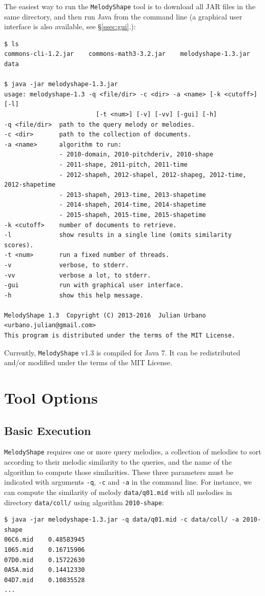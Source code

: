 \documentclass[twoside]{article}
\begin{document}
The easiest way to run the \texttt{MelodyShape} tool is to download all JAR files in the same directory, and then run Java from the command line (a graphical user interface is also available, see \S\ref{ssec:gui}.):
\begin{lstlisting}
$ ls
commons-cli-1.2.jar    commons-math3-3.2.jar    melodyshape-1.3.jar    data

$ java -jar melodyshape-1.3.jar
usage: melodyshape-1.3 -q <file/dir> -c <dir> -a <name> [-k <cutoff>] [-l]
                         [-t <num>] [-v] [-vv] [-gui] [-h]
-q <file/dir>  path to the query melody or melodies.
-c <dir>       path to the collection of documents.
-a <name>      algorithm to run:
               - 2010-domain, 2010-pitchderiv, 2010-shape
               - 2011-shape, 2011-pitch, 2011-time
               - 2012-shapeh, 2012-shapel, 2012-shapeg, 2012-time, 2012-shapetime
               - 2013-shapeh, 2013-time, 2013-shapetime
               - 2014-shapeh, 2014-time, 2014-shapetime
               - 2015-shapeh, 2015-time, 2015-shapetime
-k <cutoff>    number of documents to retrieve.
-l             show results in a single line (omits similarity scores).
-t <num>       run a fixed number of threads.
-v             verbose, to stderr.
-vv            verbose a lot, to stderr.
-gui           run with graphical user interface.
-h             show this help message.

MelodyShape 1.3  Copyright (C) 2013-2016  Julian Urbano <urbano.julian@gmail.com>
This program is distributed under the terms of the MIT License.
\end{lstlisting}

Currently, \texttt{MelodyShape} v1.3 is compiled for Java 7. It can be redistributed and/or modified under the terms of the MIT License.

\section{Tool Options}

\subsection{Basic Execution}

\texttt{MelodyShape} requires one or more query melodies, a collection of melodies to sort according to their melodic similarity to the queries, and the name of the algorithm to compute those similarities. These three parameters must be indicated with arguments \texttt{-q}, \texttt{-c} and \texttt{-a} in the command line. For instance, we can compute the similarity of melody \texttt{data/q01.mid} with all melodies in directory \texttt{data/coll/} using algorithm \texttt{2010-shape}:
\begin{lstlisting}
$ java -jar melodyshape-1.3.jar -q data/q01.mid -c data/coll/ -a 2010-shape
06C6.mid    0.48583945
1065.mid    0.16715906
07D0.mid    0.15722630
0A5A.mid    0.14412330
04D7.mid    0.10835528
...
\end{lstlisting}
\end{document}
